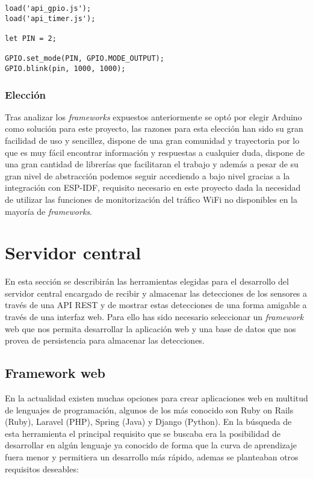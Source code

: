 \documentclass[../proyecto.tex]{subfiles}
\begin{document}
\begin{minipage}{\linewidth}
\begin{lstlisting}[caption=Ejemplo de código para hacer parpadear un led con Moongose, captionpos=b, frame=single]
load('api_gpio.js');
load('api_timer.js');

let PIN = 2;

GPIO.set_mode(PIN, GPIO.MODE_OUTPUT);
GPIO.blink(pin, 1000, 1000);
\end{lstlisting}
\end{minipage}

\subsubsection{Elección}

Tras analizar los \textit{frameworks} expuestos anteriormente se optó por elegir Arduino como solución para este proyecto, las razones para esta elección han sido su gran facilidad de uso  y sencillez, dispone de una gran comunidad y trayectoria por lo que es muy fácil encontrar información y respuestas a cualquier duda, dispone de una gran cantidad de librerías que facilitaran el trabajo y además a pesar de su gran nivel de abstracción podemos seguir accediendo a bajo nivel gracias a la integración con ESP-IDF, requisito necesario en este proyecto dada la necesidad de utilizar las funciones de monitorización del tráfico WiFi no disponibles en la mayoría de \textit{frameworks}.

\section{Servidor central}

En esta sección se describirán las herramientas elegidas para el desarrollo del servidor central encargado de recibir y almacenar las detecciones de los sensores a través de una API REST y de mostrar estas detecciones de una forma amigable a través de una interfaz web. Para ello has sido necesario seleccionar un \textit{framework} web que nos permita desarrollar la aplicación web y una base de datos que nos provea de persistencia para almacenar las detecciones.

\subsection{Framework web}

En la actualidad existen muchas opciones para crear aplicaciones web en multitud de lenguajes de programación, algunos de los más conocido son Ruby on Rails (Ruby), Laravel (PHP), Spring (Java) y Django (Python). En la búsqueda de esta herramienta el principal requisito que se buscaba era la posibilidad de desarrollar en algún lenguaje ya conocido de forma que la curva de aprendizaje fuera menor y permitiera un desarrollo más rápido, ademas se planteaban otros requisitos deseables:
\end{document}
